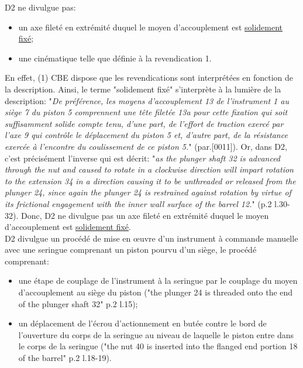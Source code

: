 D2 ne divulgue pas:
\begin{itemize}
  \item un axe fileté en extrémité duquel le moyen d'accouplement est \underline{solidement fixé};
  \item une cinématique telle que définie à la revendication 1.\\
\end{itemize}

En effet, (1) CBE dispose que les revendications sont interprétées en fonction de la description. Ainsi,
le terme "solidement fixé" s'interprète à la lumière de la description:
"\textit{De préférence, les moyens d'accouplement 13 de l'instrument 1 au siège 7 du piston 5 comprennent
une tête filetée 13a pour cette fixation qui soit suffisamment solide compte tenu, d'une part,
de l'effort de traction exercé par l'axe 9 qui contrôle le déplacement du piston 5 et, d'autre part,
de la résistance exercée à l'encontre du coulissement de ce piston 5.}" (par.[0011]). Or,
dans D2, c'est précisément l'inverse qui est décrit: "\textit{as the plunger shaft 32 is advanced through 
the nut and caused to rotate in a clockwise direction will impart rotation to the extension 34 
in a direction causing   it to be unthreaded or released from the plunger 24, since again the
plunger 24 is restrained against rotation by virtue of its frictional engagement with
the inner wall surface of the barrel 12.}" (p.2 l.30-32).
Donc, D2 ne divulgue pas un axe fileté
en extrémité duquel le moyen d'accouplement est \underline{solidement fixé}.\\


D2 divulgue un procédé de mise en œuvre d'un instrument à commande manuelle avec une seringue
comprenant un piston pourvu d'un siège, le procédé comprenant:
\begin{itemize}
  \item une étape de couplage de l'instrument à la seringue par le couplage
  du moyen d'accouplement au siège du piston ("the plunger 24 is threaded onto the end
  of the plunger shaft 32" p.2 l.15);
  \item un déplacement de l'écrou d'actionnement en butée contre le bord de l'ouverture du corps
  de la seringue au niveau de laquelle le piston entre dans le corps de la seringue
  ("the nut 40 is inserted into the flanged end portion 18 of the barrel" p.2 l.18-19).\\
\end{itemize}

